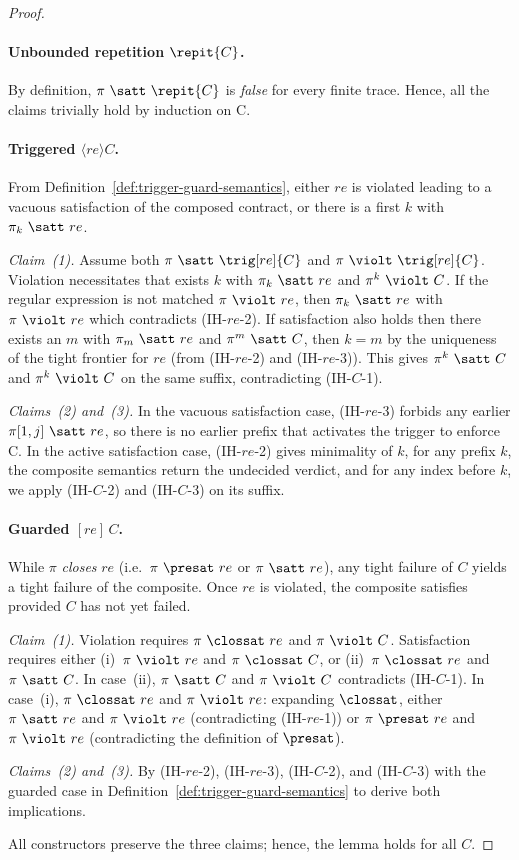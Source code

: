\begin{proof}
\paragraph{Unbounded repetition $\repit{C}$.}
By definition, $\pi\ \satt\ \repit{C}$ is \emph{false} for every finite trace. Hence, all the claims trivially hold by induction on C.


\paragraph{Triggered $\langle re\rangle C$.}
From Definition~\ref{def:trigger-guard-semantics}, either $re$ is violated leading to a vacuous satisfaction of the composed contract, or there is a first $k$ with $\pi_k\ \satt\ re$.

\emph{Claim~(1).} Assume both $\pi\ \satt\ \trig[re]{C}$ and $\pi\ \violt\ \trig[re]{C}$.
Violation necessitates that exists $k$ with $\pi_k\ \satt\ re$ and $\pi^{k}\ \violt\ C$.
If the regular expression is not matched $\pi\ \violt\ re$, then $\pi_k\ \satt\ re$ with $\pi\ \violt\ re$ which contradicts (IH-$re$-2).
If satisfaction also holds then there exists an $m$ with $\pi_m\ \satt\ re$ and $\pi^{m}\ \satt\ C$, then $k = m$ by the uniqueness of the tight frontier for $re$ (from (IH-$re$-2) and (IH-$re$-3)).
This gives $\pi^{k}\ \satt\ C$ and $\pi^{k}\ \violt\ C$ on the same suffix, contradicting (IH-$C$-1).

\emph{Claims~(2) and~(3).}
In the vacuous satisfaction case, (IH-$re$-3) forbids any earlier $\pi[1,j]\ \satt\ re$, so there is no earlier prefix that activates the trigger to enforce C.
In the active satisfaction case, (IH-$re$-2) gives minimality of $k$, for any prefix $k$, the composite semantics return the undecided verdict, and for any index before $k$, we apply (IH-$C$-2) and (IH-$C$-3) on its suffix.

\paragraph{Guarded $[re]\,C$.}
While $\pi$ \emph{closes} $re$ (i.e.\ $\pi\ \presat\ re$ or $\pi\ \satt\ re$), any tight failure of $C$ yields a tight failure of the composite.
Once $re$ is violated, the composite satisfies provided $C$ has not yet failed.

\emph{Claim~(1).}
Violation requires $\pi\ \clossat\ re$ and $\pi\ \violt\ C$.
Satisfaction requires either (i)~$\pi\ \violt\ re$ and $\pi\ \clossat\ C$, or (ii)~$\pi\ \clossat\ re$ and $\pi\ \satt\ C$.
In case~(ii), $\pi\ \satt\ C$ and $\pi\ \violt\ C$ contradicts (IH-$C$-1).
In case~(i), $\pi\ \clossat\ re$ and $\pi\ \violt\ re$:
expanding $\clossat$, either $\pi\ \satt\ re$ and $\pi\ \violt\ re$ (contradicting (IH-$re$-1)) or $\pi\ \presat\ re$ and $\pi\ \violt\ re$ (contradicting the definition of $\presat$).

\emph{Claims~(2) and~(3).}
By (IH-$re$-2), (IH-$re$-3), (IH-$C$-2), and (IH-$C$-3) with the guarded case in Definition~\ref{def:trigger-guard-semantics} to derive both implications.

\medskip
All constructors preserve the three claims; hence, the lemma holds for all $C$.
\end{proof}

